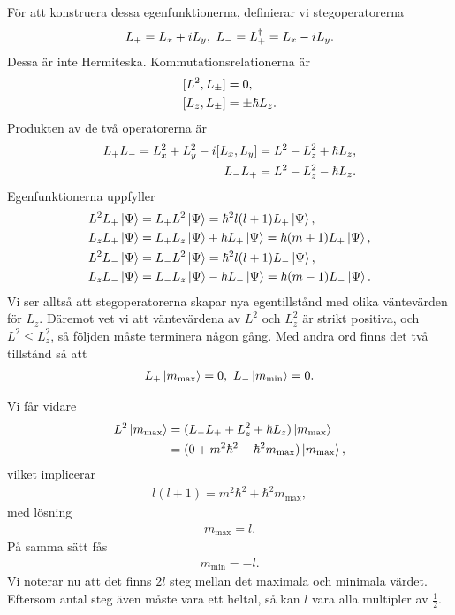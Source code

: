För att konstruera dessa egenfunktionerna, definierar vi stegoperatorerna
\begin{align*}
	L_{+} = L_{x} + iL_{y},\ L_{-} = L_{+}^{\dagger} = L_{x} - iL_{y}.
\end{align*}
Dessa är inte Hermiteska. Kommutationsrelationerna är
\begin{align*}
	\commut{L^{2}}{L_{\pm}} &= 0, \\
	\commut{L_{z}}{L_{\pm}} &= \pm\hbar L_{z}.
\end{align*}
Produkten av de två operatorerna är
\begin{align*}
	L_{+}L_{-} = L_{x}^{2} + L_{y}^{2} - i[L_{x}, L_{y}] = L^{2} - L_{z}^{2} + \hbar L_{z}, \\
	L_{-}L_{+} = L^{2} - L_{z}^{2} - \hbar L_{z}.
\end{align*}
Egenfunktionerna uppfyller
\begin{align*}
	L^{2}L_{+}\ket{\Psi} &= L_{+}L^{2}\ket{\Psi} = \hbar^{2}l(l + 1)L_{+}\ket{\Psi}, \\
	L_{z}L_{+}\ket{\Psi} &= L_{+}L_{z}\ket{\Psi} + \hbar L_{+}\ket{\Psi} = \hbar(m + 1)L_{+}\ket{\Psi}, \\
	L^{2}L_{-}\ket{\Psi} &= L_{-}L^{2}\ket{\Psi} = \hbar^{2}l(l + 1)L_{-}\ket{\Psi}, \\
	L_{z}L_{-}\ket{\Psi} &= L_{-}L_{z}\ket{\Psi} - \hbar L_{-}\ket{\Psi} = \hbar(m - 1)L_{-}\ket{\Psi}.
\end{align*}
Vi ser alltså att stegoperatorerna skapar nya egentillstånd med olika väntevärden för $L_{z}$. Däremot vet vi att väntevärdena av $L^{2}$ och $L_{z}^{2}$ är strikt positiva, och $L^{2} \leq L_{z}^{2}$, så följden måste terminera någon gång. Med andra ord finns det två tillstånd så att
\begin{align*}
	L_{+}\ket{m_{\text{max}}} = 0,\ L_{-}\ket{m_{\text{min}}} = 0.
\end{align*}

Vi får vidare
\begin{align*}
	L^{2}\ket{m_{\text{max}}} &= (L_{-}L_{+} + L_{z}^{2} + \hbar L_{z})\ket{m_{\text{max}}} \\
	                          &= (0 + m^{2}\hbar^{2} + \hbar^{2}m_{\text{max}})\ket{m_{\text{max}}},
\end{align*}
vilket implicerar
\begin{align*}
	l(l + 1) = m^{2}\hbar^{2} + \hbar^{2}m_{\text{max}},
\end{align*}
med lösning
\begin{align*}
	m_{\text{max}} = l.
\end{align*}
På samma sätt fås
\begin{align*}
	m_{\text{min}} = -l.
\end{align*}
Vi noterar nu att det finns $2l$ steg mellan det maximala och minimala värdet. Eftersom antal steg även måste vara ett heltal, så kan $l$ vara alla multipler av $\frac{1}{2}$.

